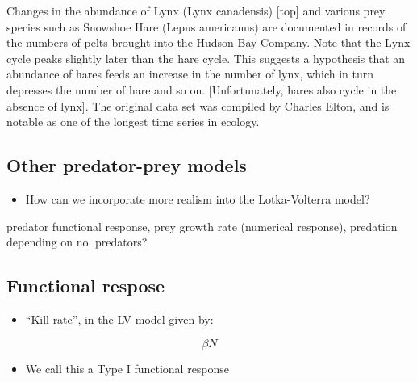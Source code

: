 \documentclass[
  letterpaper,
  DIV=11,
  numbers=noendperiod]{scrartcl}
\providecommand{\tightlist}{%
  \setlength{\itemsep}{0pt}\setlength{\parskip}{0pt}}\usepackage{longtable,booktabs,array}
\begin{document}
Changes in the abundance of Lynx (Lynx canadensis) {[}top{]} and various
prey species such as Snowshoe Hare (Lepus americanus) are documented in
records of the numbers of pelts brought into the Hudson Bay Company.
Note that the Lynx cycle peaks slightly later than the hare cycle. This
suggests a hypothesis that an abundance of hares feeds an increase in
the number of lynx, which in turn depresses the number of hare and so
on. {[}Unfortunately, hares also cycle in the absence of lynx{]}. The
original data set was compiled by Charles Elton, and is notable as one
of the longest time series in ecology.

\hypertarget{other-predator-prey-models}{%
\subsection{Other predator-prey
models}\label{other-predator-prey-models}}

\begin{itemize}
\tightlist
\item
  How can we incorporate more realism into the Lotka-Volterra model?
\end{itemize}

predator functional response, prey growth rate (numerical response),
predation depending on no. predators?

\hypertarget{functional-respose}{%
\subsection{Functional respose}\label{functional-respose}}

\begin{itemize}
\tightlist
\item
  ``Kill rate'', in the LV model given by:
\end{itemize}

\[\beta N\]

\begin{itemize}
\tightlist
\item
  We call this a Type I functional response
\end{itemize}
\end{document}
